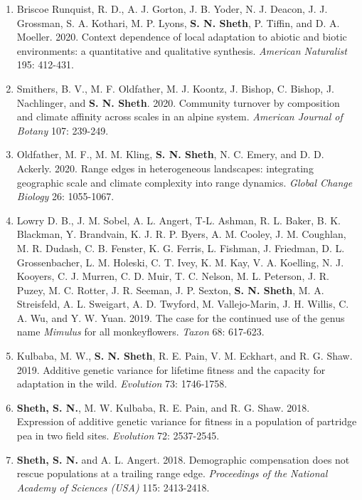\documentclass[11pt,english]{article}\usepackage[]{graphicx}\usepackage[]{color}
\begin{document}
\begin{hangparas}{.5in}{1}
\begin{enumerate}
\item Briscoe Runquist, R. D., A. J. Gorton, J. B. Yoder, N. J. Deacon, J. J. Grossman, S. A. Kothari, M. P. Lyons, \textbf{S. N. Sheth}, P. Tiffin, and D. A. Moeller. 2020. Context dependence of local adaptation to abiotic and biotic environments: a quantitative and qualitative synthesis. \emph{American Naturalist} 195: 412-431.

\item Smithers, B. V., M. F. Oldfather, M. J. Koontz, J. Bishop, C. Bishop, J. Nachlinger, and \textbf{S. N. Sheth}. 2020. Community turnover by composition and climate affinity across scales in an alpine system. \emph{American Journal of Botany} 107: 239-249.

\item Oldfather, M. F., M. M. Kling, \textbf{S. N. Sheth}, N. C. Emery, and D. D. Ackerly. 2020. Range edges in heterogeneous landscapes: integrating geographic scale and climate complexity into range dynamics. \emph{Global Change Biology} 26: 1055-1067. 

\item Lowry D. B., J. M. Sobel, A. L. Angert, T-L. Ashman, R. L. Baker, B. K. Blackman, Y. Brandvain, K. J. R. P. Byers, A. M. Cooley, J. M. Coughlan, M. R. Dudash, C. B. Fenster, K. G. Ferris, L. Fishman, J. Friedman, D. L. Grossenbacher, L. M. Holeski, C. T. Ivey, K. M. Kay, V. A. Koelling, N. J. Kooyers, C. J. Murren, C. D. Muir, T. C. Nelson, M. L. Peterson, J. R. Puzey, M. C. Rotter, J. R. Seeman, J. P. Sexton, \textbf{S. N. Sheth}, M. A. Streisfeld, A. L. Sweigart, A. D. Twyford, M. Vallejo-Marin, J. H. Willis, C. A. Wu, and Y. W. Yuan. 2019. The case for the continued use of the genus name \textit{Mimulus} for all monkeyflowers. \emph{Taxon} 68: 617-623. 

\item Kulbaba, M. W., \textbf{S. N. Sheth}, R. E. Pain, V. M. Eckhart, and R. G. Shaw. 2019. Additive genetic variance for lifetime fitness and the capacity for adaptation in the wild. \emph{Evolution} 73: 1746-1758. 

\item \textbf{Sheth, S. N.}, M. W. Kulbaba, R. E. Pain, and R. G. Shaw. 2018. Expression of additive genetic variance for fitness in a population of partridge pea in two field sites. \emph{Evolution} 72: 2537-2545. 

\item \textbf{Sheth, S. N.} and A. L. Angert. 2018. Demographic compensation does not rescue populations at a trailing range edge. \emph{Proceedings of the National Academy of Sciences (USA)} 115: 2413-2418. 


\end{enumerate}
\end{hangparas}
\end{document}

